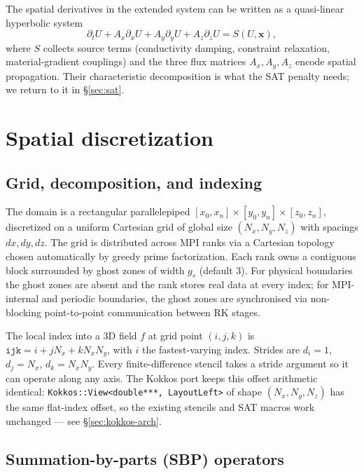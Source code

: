 \documentclass[11pt]{article}
\newcommand{\vx}{\mathbf{x}}
\begin{document}
The spatial derivatives in the extended system can be written as a
quasi-linear hyperbolic system
\begin{equation}
  \partial_t U + A_x \partial_x U + A_y \partial_y U + A_z \partial_z U
  = S(U, \vx),
  \label{eq:flux-form}
\end{equation}
where $S$ collects source terms (conductivity damping, constraint
relaxation, material-gradient couplings) and the three flux matrices
$A_x, A_y, A_z$ encode spatial propagation.  Their characteristic
decomposition is what the SAT penalty needs; we return to it in
\S\ref{sec:sat}.

\section{Spatial discretization}
\label{sec:spatial}

\subsection{Grid, decomposition, and indexing}

The domain is a rectangular parallelepiped
$[x_0, x_n]\times[y_0, y_n]\times[z_0, z_n]$, discretized on a
uniform Cartesian grid of global size $(N_x, N_y, N_z)$ with
spacings $dx, dy, dz$.  The grid is distributed across MPI ranks
via a Cartesian topology chosen automatically by greedy prime
factorization.  Each rank owns a contiguous block surrounded by
ghost zones of width $g_s$ (default 3).  For physical boundaries
the ghost zones are absent and the rank stores real data at every
index; for MPI-internal and periodic boundaries, the ghost zones
are synchronised via non-blocking point-to-point communication
between RK stages.

The local index into a 3D field $f$ at grid point $(i, j, k)$ is
$\mathtt{ijk} = i + j N_x + k N_x N_y$, with $i$ the fastest-varying
index.  Strides are $d_i = 1$, $d_j = N_x$, $d_k = N_x N_y$.  Every
finite-difference stencil takes a stride argument so it can operate
along any axis.  The Kokkos port keeps this offset arithmetic
identical: \texttt{Kokkos::View<double***, LayoutLeft>} of shape
$(N_x, N_y, N_z)$ has the same flat-index offset, so the existing
stencils and SAT macros work unchanged --- see
\S\ref{sec:kokkos-arch}.

\subsection{Summation-by-parts (SBP) operators}
\label{sec:sbp-operators}
\end{document}
